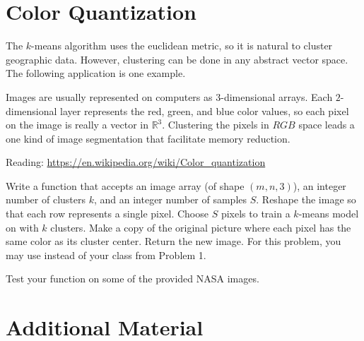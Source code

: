 \section*{Color Quantization} %

The $k$-means algorithm uses the euclidean metric, so it is natural to cluster geographic data.
However, clustering can be done in any abstract vector space.
The following application is one example.

Images are usually represented on computers as $3$-dimensional arrays.
Each $2$-dimensional layer represents the red, green, and blue color values, so each pixel on the image is really a vector in $\mathbb{R}^3$.
Clustering the pixels in $RGB$ space leads a one kind of image segmentation that facilitate memory reduction.

Reading: \url{https://en.wikipedia.org/wiki/Color_quantization}

\begin{problem}
Write a function that accepts an image array (of shape $(m,n,3)$), an integer number of clusters $k$, and an integer number of samples $S$.
Reshape the image so that each row represents a single pixel.
Choose $S$ pixels to train a $k$-means model on with $k$ clusters.
Make a copy of the original picture where each pixel has the same color as its cluster center.
Return the new image.
For this problem, you may use  instead of your  class from Problem 1.

Test your function on some of the provided NASA images.
\end{problem}

\newpage

\section*{Additional Material} %

